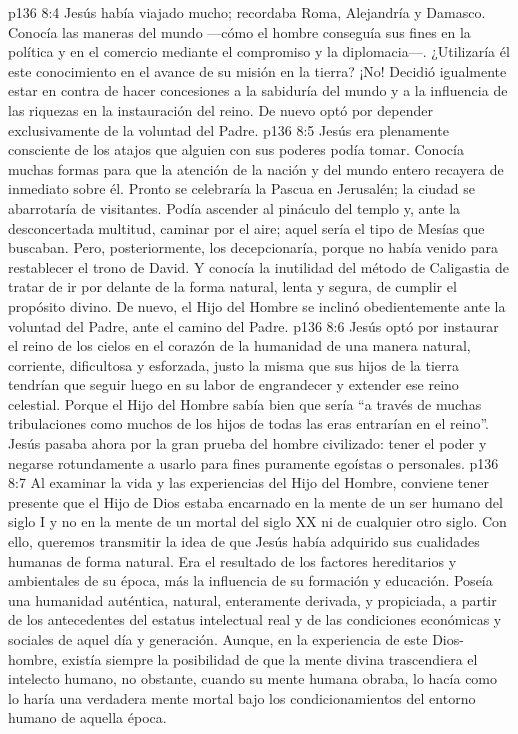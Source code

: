 \vs p136 8:4 \pc Jesús había viajado mucho; recordaba Roma, Alejandría y Damasco. Conocía las maneras del mundo ---cómo el hombre conseguía sus fines en la política y en el comercio mediante el compromiso y la diplomacia---. ¿Utilizaría él este conocimiento en el avance de su misión en la tierra? ¡No! Decidió igualmente estar en contra de hacer concesiones a la sabiduría del mundo y a la influencia de las riquezas en la instauración del reino. De nuevo optó por depender exclusivamente de la voluntad del Padre.
\vs p136 8:5 Jesús era plenamente consciente de los atajos que alguien con sus poderes podía tomar. Conocía muchas formas para que la atención de la nación y del mundo entero recayera de inmediato sobre él. Pronto se celebraría la Pascua en Jerusalén; la ciudad se abarrotaría de visitantes. Podía ascender al pináculo del templo y, ante la desconcertada multitud, caminar por el aire; aquel sería el tipo de Mesías que buscaban. Pero, posteriormente, los decepcionaría, porque no había venido para restablecer el trono de David. Y conocía la inutilidad del método de Caligastia de tratar de ir por delante de la forma natural, lenta y segura, de cumplir el propósito divino. De nuevo, el Hijo del Hombre se inclinó obedientemente ante la voluntad del Padre, ante el camino del Padre.
\vs p136 8:6 Jesús optó por instaurar el reino de los cielos en el corazón de la humanidad de una manera natural, corriente, dificultosa y esforzada, justo la misma que sus hijos de la tierra tendrían que seguir luego en su labor de engrandecer y extender ese reino celestial. Porque el Hijo del Hombre sabía bien que sería “a través de muchas tribulaciones como muchos de los hijos de todas las eras entrarían en el reino”. Jesús pasaba ahora por la gran prueba del hombre civilizado: tener el poder y negarse rotundamente a usarlo para fines puramente egoístas o personales.
\vs p136 8:7 \pc Al examinar la vida y las experiencias del Hijo del Hombre, conviene tener presente que el Hijo de Dios estaba encarnado en la mente de un ser humano del siglo I y no en la mente de un mortal del siglo XX ni de cualquier otro siglo. Con ello, queremos transmitir la idea de que Jesús había adquirido sus cualidades humanas de forma natural. Era el resultado de los factores hereditarios y ambientales de su época, más la influencia de su formación y educación. Poseía una humanidad auténtica, natural, enteramente derivada, y propiciada, a partir de los antecedentes del estatus intelectual real y de las condiciones económicas y sociales de aquel día y generación. Aunque, en la experiencia de este Dios\hyp{}hombre, existía siempre la posibilidad de que la mente divina trascendiera el intelecto humano, no obstante, cuando su mente humana obraba, lo hacía como lo haría una verdadera mente mortal bajo los condicionamientos del entorno humano de aquella época.

